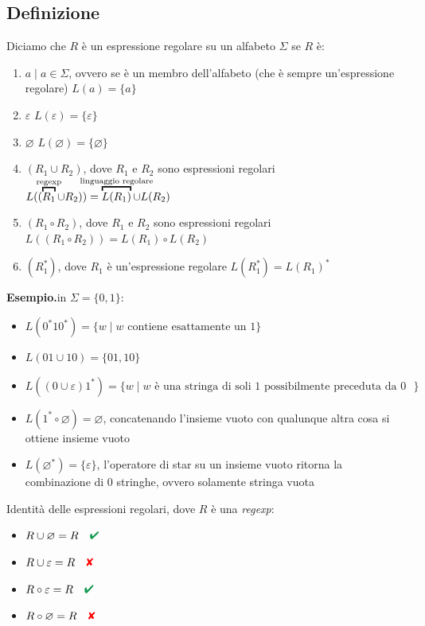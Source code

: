 \documentclass[italian]{article}
\newcommand{\crossmark}{\textcolor{red}{\text{\ding{56}}}}
\renewcommand{\checkmark}{\textcolor{ForestGreen}{\text{\ding{52}}}}
\newcommand{\taleche}{\;|\;}
\newcommand{\example}{\noindent\textbf{Esempio.\quad}}
\begin{document}
\subsection{Definizione}
Diciamo che $R$ è un espressione regolare su un alfabeto $\Sigma$ se $R$ è:
\begin{enumerate}
	\item $a \taleche a \in \Sigma$, ovvero se è un membro dell'alfabeto (che è sempre un'espressione regolare) \hfill $L(a) = \{a\}$
	\item $\varepsilon$ \hfill $L(\varepsilon) = \{\varepsilon\}$
	\item $\varnothing$ \hfill $L(\varnothing) = \{\varnothing\}$
	\item $(R_1 \cup R_2)$, dove $R_1$ e $R_2$ sono espressioni regolari \hfill $L((\overbracket{R_1}^{\mathclap{\text{regexp}}} \cup R_2)) = \overbracket{L(R_1)}^{\mathclap{\text{linguaggio regolare}}} \cup L(R_2)$
	\item $(R_1 \circ R_2)$, dove $R_1$ e $R_2$ sono espressioni regolari  \hfill $L((R_1 \circ R_2)) = L(R_1) \circ L(R_2)$
	\item $(R_1^*)$, dove $R_1$ è un'espressione regolare \hfill $L(R_1^*) = L(R_1)^*$
\end{enumerate}
\example in $\Sigma = \{0,1\}$:
\begin{itemize}
	\item $L(0^*10^*) = \{ w \taleche w \text{ contiene esattamente un 1} \}$
	\item $L(01\cup 10) = \{ 01,10 \}$
	\item $L((0\cup \varepsilon)1^*) = \{ w \taleche w \text{ è una stringa di soli $1$ possibilmente preceduta da $0$ } \}$
	\item $L(1^* \circ \varnothing) = \varnothing$, concatenando l'insieme vuoto con qualunque altra cosa si ottiene insieme vuoto
	\item $L(\varnothing^*) = \{\varepsilon\}$, l'operatore di star su un insieme vuoto ritorna la combinazione di $0$ stringhe, ovvero solamente stringa vuota
\end{itemize}
Identità delle espressioni regolari, dove $R$ è una \textit{regexp}:
\begin{itemize}
	\item $R \cup \varnothing = R \quad \checkmark$
	\item $R \cup \varepsilon = R \quad \crossmark$
	\item $R \circ \varepsilon = R \quad \checkmark$
	\item $R \circ \varnothing = R \quad \crossmark$
\end{itemize}
\pagebreak
\end{document}
